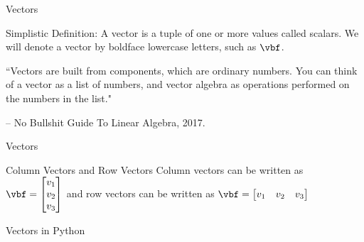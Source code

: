 \documentclass[aspectratio=169,xcolor=dvipsnames,svgnames,x11names,fleqn]{beamer}
\begin{document}
\begin{frame}{Vectors}


\begin{tblock}{Simplistic Definition:}
A vector is a tuple of one or more values called scalars.
We will denote a vector by boldface lowercase letters, such as $\vbf$.
\end{tblock}



\begin{tblock}
``Vectors are built from components, which are ordinary numbers. You can think of
a vector as a list of numbers, and vector algebra as operations performed on the
numbers in the list."

-- No Bullshit Guide To Linear Algebra, 2017.
\end{tblock}

\end{frame}

\begin{frame}{Vectors}
\begin{tblock}{Column Vectors and Row Vectors}
Column vectors can be written as $\vbf = \begin{bmatrix}
v_1\\
v_2\\
v_3
\end{bmatrix}$ and row vectors can be written as  $\vbf = \begin{bmatrix}
v_1 & v_2 & v_3
\end{bmatrix}$
\end{tblock}
\end{frame}

\begin{frame}[containsverbatim]{Vectors in Python}
\end{frame}
\end{document}
